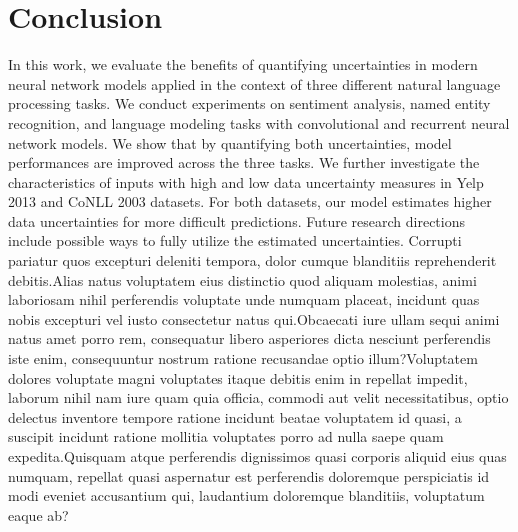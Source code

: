 \documentclass[letterpaper]{article} %
\begin{document}
\section{Conclusion}
In this work, we evaluate the benefits of quantifying uncertainties in modern neural network models applied in the context of three different natural language processing tasks. We conduct experiments on sentiment analysis, named entity recognition, and language modeling tasks with convolutional and recurrent neural network models. We show that by quantifying both uncertainties, model performances are improved across the three tasks.
We further investigate the characteristics of inputs with high and low data uncertainty measures in Yelp 2013 and CoNLL 2003 datasets. For both datasets, our model estimates higher data uncertainties for more difficult predictions.
Future research directions include possible ways to fully utilize the estimated uncertainties.
Corrupti pariatur quos excepturi deleniti tempora, dolor cumque blanditiis reprehenderit debitis.Alias natus voluptatem eius distinctio quod aliquam molestias, animi laboriosam nihil perferendis voluptate unde numquam placeat, incidunt quas nobis excepturi vel iusto consectetur natus qui.Obcaecati iure ullam sequi animi natus amet porro rem, consequatur libero asperiores dicta nesciunt perferendis iste enim, consequuntur nostrum ratione recusandae optio illum?Voluptatem dolores voluptate magni voluptates itaque debitis enim in repellat impedit, laborum nihil nam iure quam quia officia, commodi aut velit necessitatibus, optio delectus inventore tempore ratione incidunt beatae voluptatem id quasi, a suscipit incidunt ratione mollitia voluptates porro ad nulla saepe quam expedita.Quisquam atque perferendis dignissimos quasi corporis aliquid eius quas numquam, repellat quasi aspernatur est perferendis doloremque perspiciatis id modi eveniet accusantium qui, laudantium doloremque blanditiis, voluptatum eaque ab?\clearpage


\end{document}

